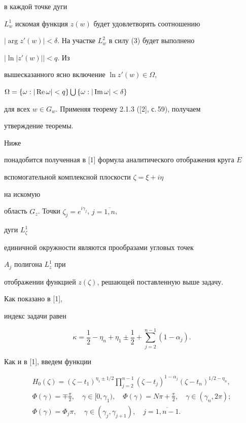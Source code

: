 в каждой точке дуги


$L_{w}^1$ искомая функция $z(w)$ будет удовлетворять соотношению


$|\arg z'(w)|<\delta$. На участке $L_w^2$ в силу (3) будет выполнено


$|\ln|z'(w)||<q$. Из


вышесказанного ясно включение $\ln z'(w)\in\Omega$,


$\Omega=\{\omega:|\operatorname{Re}\omega|<q\}\bigcup\,\{\omega:|\operatorname{Im}\omega|<\delta\}$


для всех $w\in G_w$. Применяя теорему 2.1.3 ([2], с.\,59), получаем


утверждение теоремы.





Ниже


понадобится полученная в [1] формула аналитического отображения круга $E$


вспомогательной комплексной плоскости $\zeta=\xi+i\eta$


на искомую


область $G_z$. Точки $\zeta_j=e^{i\gamma_j}$, $j=\overline{1,n}$,


дуги $L_\zeta^1$


единичной окружности являются прообразами угловых точек


$A_j$ полигона $L_z^1$ при


отображении функцией $z(\zeta)$, решающей поставленную выше задачу.


Как показано в [1],


индекс задачи равен


$$


\kappa=\frac{1}{2}-\eta_n+\eta_1\pm\frac{1}{2}+\sum_{j=2}^{n-1}(1-\alpha_j).


$$


Как и в [1], введем функции


\begin{gather*}


H_0(\zeta)=


{(\zeta-t_1)}^{\eta_1\pm{1/2}}\prod_{j=2}^{n-1}(\zeta-


t_j)^{1-\alpha_j}(\zeta-t_n)^{1/2-\eta_n},\\


\Phi(\gamma)=\mp\frac{\pi}{2},\quad \gamma\in[0,\gamma_1),\quad


\Phi(\gamma)=N\pi+\frac{\pi}{2},\quad \gamma\in (\gamma_n,2\pi); \\


\Phi(\gamma)=\Phi_{j}\pi,\quad \gamma\in(\gamma_j,\gamma_{j+1}),


\quad j=\overline{1,n-1}.


\end{gather*}





